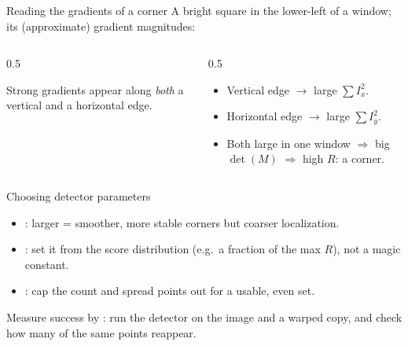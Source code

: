 \documentclass[10pt,aspectratio=169]{beamer}
\begin{document}
\begin{frame}{Reading the gradients of a corner}
  A bright square in the lower-left of a window; its (approximate) gradient magnitudes:
  \begin{columns}[T]
    \begin{column}{0.5\textwidth}
      \begin{center}
      \end{center}
      {\scriptsize Strong gradients appear along \emph{both} a vertical and a horizontal edge.}
    \end{column}
    \begin{column}{0.5\textwidth}
      \begin{itemize}
        \item Vertical edge $\rightarrow$ large $\sum I_x^2$.
        \item Horizontal edge $\rightarrow$ large $\sum I_y^2$.
        \item Both large in one window $\Rightarrow$ big $\det(M)$ $\Rightarrow$ high $R$: a corner.
      \end{itemize}
    \end{column}
  \end{columns}
\end{frame}

\begin{frame}{Choosing detector parameters}
  \begin{goodbox}
    \begin{itemize}
      \item {}: larger = smoother, more stable corners but coarser localization.
      \item {}: set it from the score distribution (e.g.\ a fraction of the max $R$), not a magic constant.
      \item {}: cap the count and spread points out for a usable, even set.
    \end{itemize}
  \end{goodbox}
  Measure success by : run the detector on the image and a warped copy, and check how
  many of the same points reappear.
\end{frame}
\end{document}
